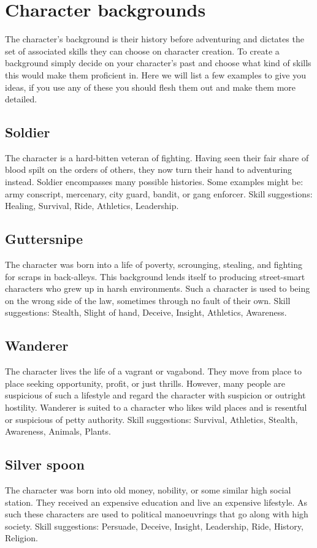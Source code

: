\documentclass[a4paper,10pt,oneside]{book}
\begin{document}
\section{Character backgrounds}
\label{sec:backgrounds}
The character's background is their history before adventuring and dictates the set of associated skills they can choose on character creation. To create a background simply decide on your character's past and choose what kind of skills this would make them proficient in. Here we will list a few examples to give you ideas, if you use any of these you should flesh them out and make them more detailed.

\subsection{Soldier}
The character is a hard-bitten veteran of fighting. Having seen their fair share of blood spilt on the orders of others, they now turn their hand to adventuring instead. Soldier encompasses many possible histories. Some examples might be: army conscript, mercenary, city guard, bandit, or gang enforcer. Skill suggestions: Healing, Survival, Ride, Athletics, Leadership. 

\subsection{Guttersnipe}
The character was born into a life of poverty, scrounging, stealing, and fighting for scraps in back-alleys. This background lends itself to producing street-smart characters who grew up in harsh environments. Such a character is used to being on the wrong side of the law, sometimes through no fault of their own. Skill suggestions: Stealth, Slight of hand, Deceive, Insight, Athletics, Awareness.

\subsection{Wanderer}
The character lives the life of a vagrant or vagabond. They move from place to place seeking opportunity, profit, or just thrills. However, many people are suspicious of such a lifestyle and regard the character with suspicion or outright hostility. Wanderer is suited to a character who likes wild places and is resentful or suspicious of petty authority. Skill suggestions: Survival, Athletics, Stealth, Awareness, Animals, Plants.

\subsection{Silver spoon}
The character was born into old money, nobility, or some similar high social station. They received an expensive education and live an expensive lifestyle. As such these characters are used to political manoeuvrings that go along with high society. Skill suggestions: Persuade, Deceive, Insight, Leadership, Ride, History, Religion.
\end{document}
